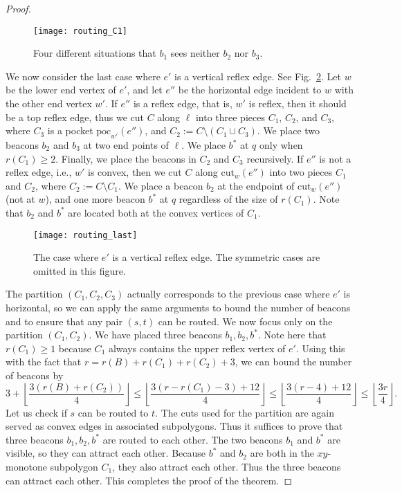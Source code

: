 \documentclass[11pt]{article}
\newcommand{\cut}{\ensuremath{\mathrm{cut}}}
\newcommand{\poc}{\ensuremath{\mathrm{poc}}}
\theoremstyle{definition}
\let\geq\geqslant
\let\leq\leqslant
\begin{document}
\begin{proof}
\begin{figure}[tb]
\centering
\texttt{[image: routing\_C1]}
\caption{Four different situations that $b_1$ sees neither $b_2$ nor $b_3$.}
\label{fig:routing_C1}
\end{figure}

We now consider the last case where $e'$ is a vertical reflex edge. See Fig.~\ref{fig:routing_last}. Let $w$ be the lower end vertex of $e'$, and let $e''$ be the horizontal edge incident to $w$ with the other end vertex $w'$. If $e''$ is a reflex edge, that is, $w'$ is reflex, then it should be a top reflex edge, thus we cut $C$ along $\ell$ into three pieces $C_1$, $C_2$, and $C_3$, where $C_3$ is a pocket $\poc_{w'}(e'')$, and $C_2 := C\setminus (C_1\cup C_3)$. We place two beacons $b_2$ and $b_3$ at two end points of $\ell$. We place $b^*$ at $q$ only when $r(C_1)\geq 2$. Finally, we place the beacons in $C_2$ and $C_3$ recursively. If $e''$ is not a reflex edge, i.e., $w'$ is convex, then we cut $C$ along $\cut_{w}(e'')$ into two pieces $C_1$ and $C_2$, where $C_2:= C\setminus C_1$. We place a beacon $b_2$ at the endpoint of $\cut_{w}(e'')$ (not at $w$), and one more beacon $b^*$ at $q$ regardless of the size of $r(C_1)$. Note that $b_2$ and $b^*$ are located both at the convex vertices of $C_1$.

\begin{figure}[tb]
\centering
\texttt{[image: routing\_last]}
\caption{The case where $e'$ is a vertical reflex edge. The symmetric cases are omitted in this figure.}
\label{fig:routing_last}
\end{figure}

The partition $(C_1, C_2, C_3)$ actually corresponds to the previous case where $e'$ is horizontal, so we can apply the same arguments to bound the number of beacons and to ensure that any pair $(s, t)$ can be routed. We now focus only on the partition $(C_1, C_2)$. We have placed three beacons $b_1, b_2, b^*$. Note here that $r(C_1)\geq 1$ because $C_1$ always contains the upper reflex vertex of $e'$. Using this with the fact that $r = r(B)+r(C_1)+r(C_2)+3$, we can bound the number of beacons by
\[
3+\left\lfloor \frac{3(r(B)+r(C_2))}{4}\right\rfloor \leq \left\lfloor \frac{3(r-r(C_1)-3)+12}{4}\right\rfloor \leq \left\lfloor \frac{3(r-4)+12}{4} \right\rfloor \leq \left\lfloor \frac{3r}{4} \right\rfloor.
\] Let us check if $s$ can be routed to $t$. The cuts used for the partition are again served as convex edges in associated subpolygons. Thus it suffices to prove that three beacons $b_1, b_2, b^*$ are routed to each other. The two beacons $b_1$ and $b^*$ are visible, so they can attract each other. Because $b^*$ and $b_2$ are both in the $xy$-monotone subpolygon $C_1$, they also attract each other. Thus the three beacons can attract each other. This completes the proof of the theorem.
\end{proof}
\end{document}
